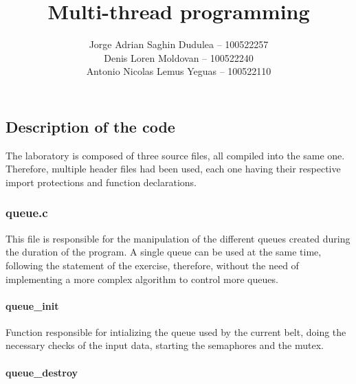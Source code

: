 \documentclass[es]{uc3mreport}
\author{
          Jorge Adrian Saghin Dudulea -- 100522257
      \\
          Denis Loren Moldovan -- 100522240
      \\
          Antonio Nicolas Lemus Yeguas -- 100522110
      }
\title{Multi-thread programming}
\begin{document}
    \makecover

    \tableofcontents

    \begin{report}

      \part{Description of the code}

      \setcounter{section}{0}

      \setcounter{subsection}{0}

      \setcounter{subsubsection}{0}

      The laboratory is composed of three source files, all compiled
      into the same one. Therefore, multiple header files had been used,
      each one having their respective import protections and function
      declarations.

      \section{queue.c}

      \setcounter{subsection}{0}

      \setcounter{subsubsection}{0}

      This file is responsible for the manipulation of the different
      queues created during the duration of the program. A single queue
      can be used at the same time, following the statement of the
      exercise, therefore, without the need of implementing a more
      complex algorithm to control more queues.

      \subsection{queue\_init\(\)}

      \setcounter{subsubsection}{0}

      Function responsible for intializing the queue used by the current
      belt, doing the necessary checks of the input data, starting the
      semaphores and the mutex.

      \subsection{queue\_destroy\(\)}

      \setcounter{subsubsection}{0}


\end{report}
\end{document}
